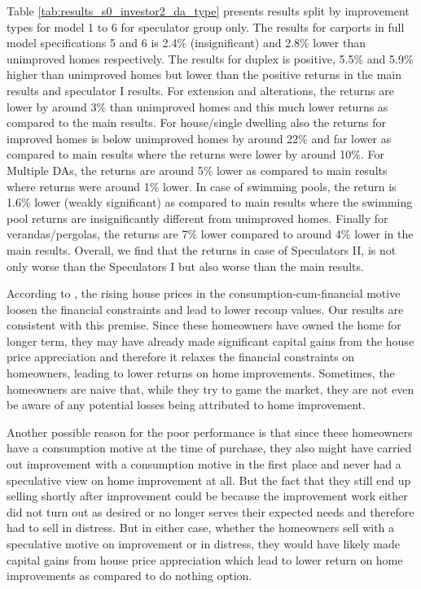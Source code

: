 \documentclass[AEJ,reqno, draftmode]{AEA} %
\begin{document}

\restoregeometry

Table \ref{tab:results_s0_investor2_da_type} presents results split by improvement types for model 1 to 6 for speculator group only. The results for carports in full model specifications 5 and 6 is 2.4\% (insignificant) and 2.8\% lower than unimproved homes respectively. The results for duplex is positive, 5.5\% and 5.9\% higher than unimproved homes but lower than the positive returns in the main results and speculator I results. For extension and alterations, the returns are lower by around 3\% than unimproved homes and this much lower returns as compared to the main results. For house/single dwelling also the returns for improved homes is below unimproved homes by around 22\% and far lower as compared to main results where the returns were lower by around 10\%. For Multiple DAs, the returns are around 5\% lower as compared to main results where returns were around 1\% lower. In case of swimming pools, the return is 1.6\% lower (weakly significant) as compared to main results where the swimming pool returns are insignificantly different from unimproved homes. Finally for verandas/pergolas, the returns are 7\% lower compared to around 4\% lower in the main results. Overall, we find that the returns in case of Speculators II, is not only worse than the Speculators I but also worse than the main results. 

According to \citet{choi2014speculating}, the rising house prices in the consumption-cum-financial motive loosen the financial constraints and lead to lower recoup values. Our results are consistent with this premise. Since these homeowners have owned the home for longer term, they may have already made significant capital gains from the house price appreciation and therefore it relaxes the financial constraints on homeowners, leading to lower returns on home improvements. Sometimes, the homeowners are naive that, while they try to game the market, they are not even be aware of any potential losses being attributed to home improvement. 

Another possible reason for the poor performance is that since these homeowners have a consumption motive at the time of purchase, they also might have carried out improvement with a consumption motive in the first place and never had a speculative view on home improvement at all. But the fact that they still end up selling shortly after improvement could be because the improvement work either did not turn out as desired or no longer serves their expected needs and therefore had to sell in distress. But in either case, whether the homeowners sell with a speculative motive on improvement or in distress, they would have likely made capital gains from house price appreciation which lead to lower return on home improvements as compared to do nothing option.
\end{document}
